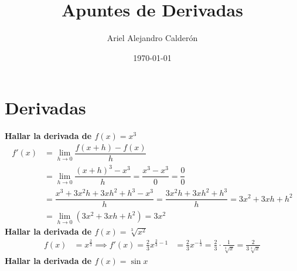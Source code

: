 \documentclass[12pt,a4paper,fleqn]{article}
\title{Apuntes de Derivadas}
\author{Ariel Alejandro Calderón}
\date{\today}
\begin{document}
\maketitle

\newpage
\tableofcontents
\newpage

\section{Derivadas}

\textbf{Hallar la derivada de $f(x)=x^3$}
\begin{align*}
	f'(x) & = \lim_{h \to 0} \dfrac{f(x+h) - f(x)}{h}                                                        \\
	      & = \lim_{h \to 0} \dfrac{(x+h)^3 - x^3}{h} = \dfrac{x^3 - x^3}{0} = \dfrac{0}{0}                  \\
	      & = \dfrac{x^3 + 3x^2h + 3xh^2 + h^3 - x^3}{h} = \dfrac{3x^2h + 3xh^2 + h^3}{h} = 3x^2 + 3xh + h^2 \\
	      & = \lim_{h \to 0} (3x^2 + 3xh + h^2) = 3x^2
\end{align*}
\textbf{Hallar la derivada de $f(x)=\sqrt[3]{x^2}$}
\begin{align*}
	f(x) & = x^{\frac{2}{3}} \implies f'(x)= \frac{2}{3}x^{\frac{2}{3}-1}
	     & = \frac{2}{3}x^{-\frac{1}{3}}=\frac{2}{3}\cdot\frac{1}{\sqrt[3]{x}}=\frac{2}{3\sqrt[3]{x}}
\end{align*}
\textbf{Hallar la derivada de $f(x)= \sin x$}\\[10pt]
\end{document}
